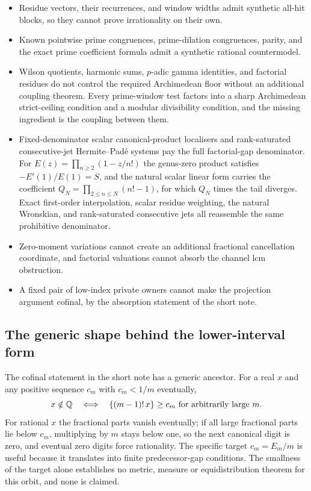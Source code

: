 \documentclass[11pt]{article}
\newcommand{\Ser}{S}
\begin{document}
\begin{itemize}
\item Residue vectors, their recurrences, and window widths admit synthetic
  all-hit blocks, so they cannot prove irrationality on their own.
\item Known pointwise prime congruences, prime-dilation congruences, parity,
  and the exact prime coefficient formula admit a synthetic rational
  countermodel.
\item Wilson quotients, harmonic sums, $p$-adic gamma identities, and
  factorial residues do not control the required Archimedean floor without an
  additional coupling theorem.  Every prime-window test factors into a sharp
  Archimedean strict-ceiling condition and a modular divisibility condition,
  and the missing ingredient is the coupling between them.
\item Fixed-denominator scalar canonical-product localisers and
  rank-saturated consecutive-jet Hermite--Pad\'e systems pay the full
  factorial-gap denominator.  For $E(z)=\prod_{n\ge2}(1-z/n!)$ the genus-zero
  product satisfies $-E'(1)/E(1)=\Ser$, and the natural scalar linear form
  carries the coefficient $Q_N=\prod_{2\le n\le N}(n!-1)$, for which $Q_N$
  times the tail diverges.  Exact first-order interpolation, scalar residue
  weighting, the natural Wronskian, and rank-saturated consecutive jets all
  reassemble the same prohibitive denominator.
\item Zero-moment variations cannot create an additional fractional
  cancellation coordinate, and factorial valuations cannot absorb the channel
  lcm obstruction.
\item A fixed pair of low-index private owners cannot make the projection
  argument cofinal, by the absorption statement of the short note.
\end{itemize}

\subsection{The generic shape behind the lower-interval form}
\label{long68:sec:ext-generic}

The cofinal statement in the short note has a generic ancestor.  For a real
$x$ and any positive sequence $c_m$ with $c_m<1/m$ eventually,
\[
 x\notin\mathbb{Q}
 \quad\Longleftrightarrow\quad
 \{(m-1)!\,x\}\ge c_m\ \hbox{for arbitrarily large }m .
\]
For rational $x$ the fractional parts vanish eventually; if all large
fractional parts lie below $c_m$, multiplying by $m$ stays below one, so the
next canonical digit is zero, and eventual zero digits force rationality.
The specific target $c_m=E_m/m$ is useful because it translates into finite
predecessor-gap conditions.  The smallness of the target alone establishes no
metric, measure or equidistribution theorem for this orbit, and none is
claimed.
\clearpage
\end{document}

